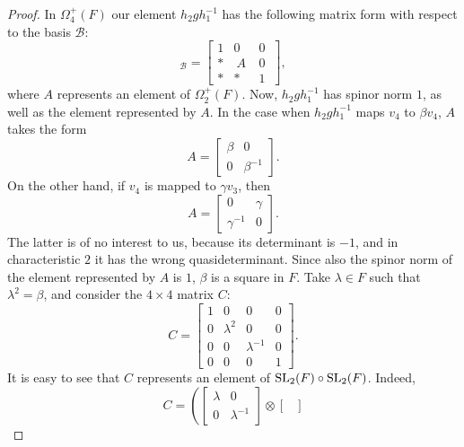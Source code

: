 \begin{proof}
	In $\Omega_4^+(F)$ our element $h_2 g h_1^{-1}$ has the following matrix form with respect to the basis $\mathcal{B}$:
	\begin{equation*}
		[h_2 g h_1^{-1}]_{\mathcal{B}} = 
		\left[
	    \begin{array}{c|c|c}
		1 & 0 & 0\  \\ \hline 
		* &\  A\   & 0\  \\ \hline
		* & * & 1\ 
	    \end{array}
	\right],
	\end{equation*}
	where $A$ represents an element of $\Omega_2^+(F)$. Now, $h_2 g h_1^{-1}$ has spinor norm $1$, as well as the element 
	represented by $A$. In the case when $h_2 g h_1^{-1}$ maps $v_4$ to $\beta v_4$, $A$ takes the form
	\begin{equation*}
		A = \begin{bmatrix}
			\beta & 0 \\
			0 & \beta^{-1}
		\end{bmatrix}.
	\end{equation*}
	On the other hand, if $v_4$ is mapped to $\gamma v_3$, then 
	\begin{equation*}
		A = \begin{bmatrix}
			0 & \gamma \\
			\gamma^{-1} & 0
		\end{bmatrix}.
	\end{equation*}
	The latter is of no interest to us, because its determinant is $-1$, and in characteristic $2$ it has the wrong quasideterminant.
	Since also the spinor norm of the element represented by $A$ is $1$, $\beta$ is a square in $F$. Take $\lambda \in F$ such
	that $\lambda^2 = \beta$, and consider the $4\times 4$ matrix $C$:
	\begin{equation*}
		C = \begin{bmatrix}
			1 & 0 & 0 & 0 \\
			0 & \lambda^2 & 0 & 0 \\
			0 & 0 & \lambda^{-1} & 0 \\
			0 & 0 & 0 & 1
		\end{bmatrix}.
	\end{equation*}
	It is easy to see that $C$ represents an element of $\mathrm{SL}_2(F) \circ \mathrm{SL}_2(F)$. Indeed,
	\begin{equation*}
		C = \left( \begin{bmatrix}
			\lambda & 0 \\
			0 & \lambda^{-1}
		\end{bmatrix} \otimes
		\begin{bmatrix}

\end{bmatrix}
\end{equation*}
\end{proof}

